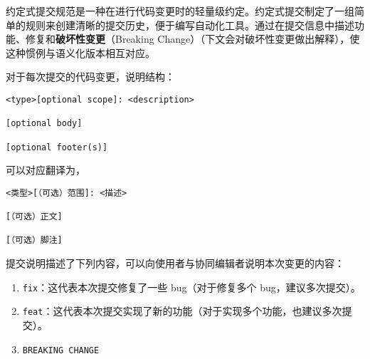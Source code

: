 
\begin{issues}
\issueDraft
\issueTODO
\end{issues}

约定式提交规范是一种在进行代码变更时的轻量级约定。约定式提交制定了一组简单的规则来创建清晰的提交历史，便于编写自动化工具。通过在提交信息中描述功能、修复和\textbf{破坏性变更}（Breaking Change）（下文会对破坏性变更做出解释），使这种惯例与语义化版本相互对应。

对于每次提交的代码变更，说明结构：
\begin{lstlisting}[language=none]
<type>[optional scope]: <description>

[optional body]

[optional footer(s)]
\end{lstlisting}
可以对应翻译为，
\begin{lstlisting}[language=none]
<类型>[（可选）范围]: <描述>

[（可选）正文]

[（可选）脚注]
\end{lstlisting}
提交说明描述了下列内容，可以向使用者与协同编辑者说明本次变更的内容：
\begin{enumerate}
\item \verb`fix`：这代表本次提交修复了一些 bug（对于修复多个 bug，建议多次提交）。
\item \verb`feat`：这代表本次提交实现了新的功能（对于实现多个功能，也建议多次提交）。
\item \verb`BREAKING CHANGE`
\end{enumerate}
